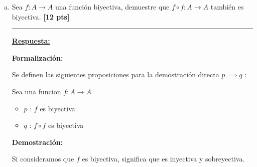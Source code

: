 \documentclass[legalpaper,10pt]{article}
\begin{document}
\begin{enumerate}[a)]
\textbf{Demostración:}

Según la definición de subconjuntos:
\[ A \subseteq B \iff \forall x \, (x \in A \implies x \in B) \]
Quiere decir que ``todos los elementos de \(A\) están en \(B\)''. Por lo tanto, se puede concluir que:
\[ \boxed{A \cap B = A} \]
Como todos los elementos de \(A\) están dentro de \(B\), todos los subconjuntos posibles de \(A\) también van a estar dentro de \(B\), es decir:
\[\boxed{2^A \subseteq B}\]
Luego, por propiedades de los conjuntos potencia, estos siempre contienen al conjunto completo como tal, es decir:
\[\boxed{A \subseteq 2^A} \text{ y } \boxed{B \subseteq 2^B}\]
Si juntamos todas las conclusiones, tenemos que:
\[\shadowbox{\(\displaystyle (A \subseteq 2^A) \land (2^A \subseteq B) \land (B \subseteq 2^B) \implies ( A \subseteq 2^A \subseteq B \subseteq 2^B) \)}\]

\textbf{Conclusión:}

Se puede notar como \(2^A\) esta contenido en \(B\), y éste a su vez esta contenido en \(2^B\). Por lo tanto, se puede concluir que:
\[\shadowbox{\(\displaystyle 2^A \subseteq 2^B \)}\]
\(\therefore\) La implicancia es cierta. \hfill \(\blacksquare\)


















\newpage

\item Sea \(f : A \to A\) una función biyectiva, demuestre que \(f \circ f :
  A \to A\) también es biyectiva. \textbf{[12 pts]}

\rule{5cm}{0.4pt}

\underline{\textbf{Respuesta:}}

\textbf{Formalización:}

Se definen las siguientes proposiciones para la demostración directa \(p \implies q\) :

Sea una funcion \(f : A \rightarrow A\)
\begin{itemize}
  \item \(p\) : \(f\) es biyectiva
  \item \(q\) : \(f \circ f\) es biyectiva
\end{itemize}

\textbf{Demostración:}

Si consideramos que \(f\) es biyectiva, significa que es inyectiva y sobreyectiva.


\end{enumerate}
\end{document}
